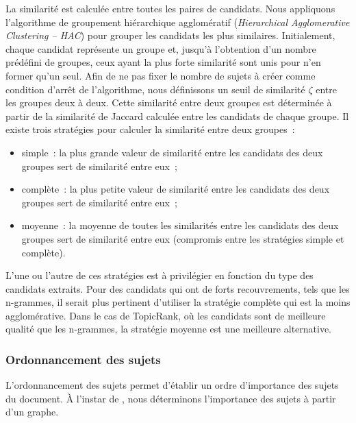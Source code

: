         La similarité est calculée entre toutes les paires de candidats. Nous
        appliquons l'algorithme de groupement hiérarchique agglomératif
        (\textit{Hierarchical Agglomerative Clustering -- \textsc{HAC}}) pour
        grouper les candidats les plus similaires. Initialement, chaque candidat
        représente un groupe et, jusqu'à l'obtention d'un nombre prédéfini de
        groupes, ceux ayant la plus forte similarité sont unis pour n'en former
        qu'un seul. Afin de ne pas fixer le nombre de sujets à créer comme
        condition d'arrêt de l'algorithme, nous définissons un seuil de
        similarité $\zeta$ entre les groupes deux à deux. Cette similarité entre
        deux groupes est déterminée à partir de la similarité de Jaccard
        calculée entre les candidats de chaque groupe. Il existe trois
        stratégies pour calculer la similarité entre deux groupes~:
        \begin{itemize}
          \item{simple~: la plus grande valeur de similarité entre les candidats
                des deux groupes sert de similarité entre eux~;}
          \item{complète~: la plus petite valeur de similarité entre les
                candidats des deux groupes sert de similarité entre eux~;}
          \item{moyenne~: la moyenne de toutes les similarités entre les
                candidats des deux groupes sert de similarité entre eux
                (compromis entre les stratégies simple et complète).}
        \end{itemize}
        L'une ou l'autre de ces stratégies est à privilégier en fonction du type
        des candidats extraits. Pour des candidats qui ont de forts
        recouvrements, tels que les n-grammes, il serait plus pertinent
        d'utiliser la stratégie complète qui est la moins agglomérative. Dans le
        cas de TopicRank, où les candidats sont de meilleure qualité que les
        n-grammes, la stratégie moyenne est une meilleure alternative.


      \subsubsection{Ordonnancement des sujets}
      \label{subsubsec:main-automatic_keyphrase_annotation-unsupervised_automatic_keyphrase_extraction-topicrank-topic_ranking}
        L'ordonnancement des sujets permet d'établir un ordre d'importance des
        sujets du document. À l'instar de , nous
        déterminons l'importance des sujets à partir d'un graphe.

